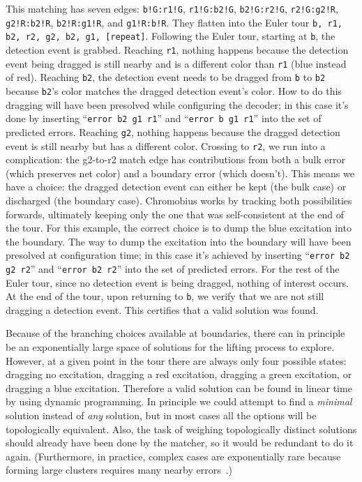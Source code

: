 \documentclass[onecolumn,unpublished,a4paper]{quantumarticle}
\theoremstyle{definition}
\theoremstyle{definition}
\theoremstyle{definition}
\begin{document}
This matching has seven edges: \texttt{b!G:r1!G}, \texttt{r1!G:b2!G}, \texttt{b2!G:r2!G}, \texttt{r2!G:g2!R}, \texttt{g2!R:b2!R}, \texttt{b2!R:g1!R}, and \texttt{g1!R:b!R}.
They flatten into the Euler tour \texttt{b, r1, b2, r2, g2, b2, g1, [repeat]}.
Following the Euler tour, starting at \texttt{b}, the detection event is grabbed.
Reaching \texttt{r1}, nothing happens because the detection event being dragged is still nearby and is a different color than \texttt{r1} (blue instead of red).
Reaching \texttt{b2}, the detection event needs to be dragged from \texttt{b} to \texttt{b2} because \texttt{b2}'s color matches the dragged detection event's color.
How to do this dragging will have been presolved while configuring the decoder; in this case it's done by inserting ``\texttt{error b2 g1 r1}'' and ``\texttt{error b g1 r1}'' into the set of predicted errors.
Reaching \texttt{g2}, nothing happens because the dragged detection event is still nearby but has a different color.
Crossing to \texttt{r2}, we run into a complication: the g2-to-r2 match edge has contributions from both a bulk error (which preserves net color) and a boundary error (which doesn't).
This means we have a choice: the dragged detection event can either be kept (the bulk case) or discharged (the boundary case).
Chromobius works by tracking both possibilities forwards, ultimately keeping only the one that was self-consistent at the end of the tour.
For this example, the correct choice is to dump the blue excitation into the boundary.
The way to dump the excitation into the boundary will have been presolved at configuration time; in this case it's achieved by inserting ``\texttt{error b2 g2 r2}'' and ``\texttt{error b2 r2}'' into the set of predicted errors.
For the rest of the Euler tour, since no detection event is being dragged, nothing of interest occurs.
At the end of the tour, upon returning to \texttt{b}, we verify that we are not still dragging a detection event.
This certifies that a valid solution was found.

Because of the branching choices available at boundaries, there can in principle be an exponentially large space of solutions for the lifting process to explore.
However, at a given point in the tour there are always only four possible states: dragging no excitation, dragging a red excitation, dragging a green excitation, or dragging a blue excitation.
Therefore a valid solution can be found in linear time by using dynamic programming.
In principle we could attempt to find a \emph{minimal} solution instead of \emph{any} solution, but in most cases all the options will be topologically equivalent.
Also, the task of weighing topologically distinct solutions should already have been done by the matcher, so it would be redundant to do it again.
(Furthermore, in practice, complex cases are exponentially rare because forming large clusters requires many nearby errors~\cite{higgott2023sparseblossom}.)
\end{document}
